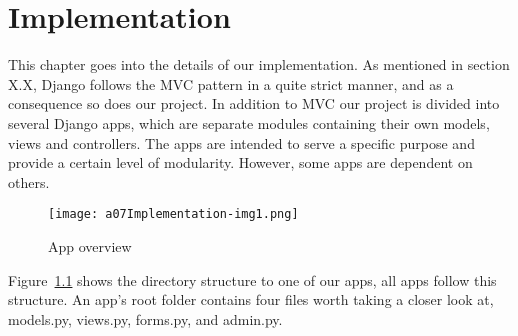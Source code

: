 \chapter{Implementation}\label{chapter:implementation}

This chapter goes into the details of our implementation. As mentioned
in section X.X, Django follows the MVC pattern in a quite strict
manner, and as a consequence so does our project. In addition to MVC
our project is divided into several Django apps, which are separate
modules containing their own models, views and controllers. The apps
are intended to serve a specific purpose and provide a certain level of
modularity. However, some apps are dependent on others.

\begin{figure}
	\texttt{[image: a07Implementation-img1.png]}
	\caption{App overview}
	\label{fig:appOverview}
\end{figure}


\bigskip

Figure~\ref{fig:appOverview} shows the directory structure to one of our apps,
all apps follow this structure. An app's root folder contains four files worth
taking a closer look at, models.py, views.py, forms.py, and admin.py. 

